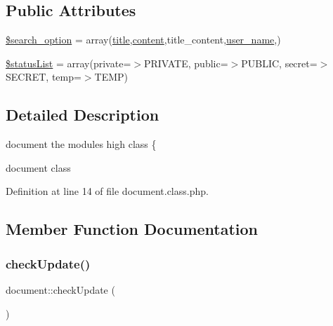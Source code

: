 \subsection*{Public Attributes}
\begin{DoxyCompactItemize}
\item 
\hyperlink{classdocument_adfef00d8f028ef4dfe991de199009d46}{\$search\+\_\+option} = array(\textquotesingle{}\hyperlink{ko_8install_8php_a5b072c5fd1d2228c6ba5cee13cd142e3}{title}\textquotesingle{},\textquotesingle{}\hyperlink{classcontent}{content}\textquotesingle{},\textquotesingle{}title\+\_\+content\textquotesingle{},\textquotesingle{}\hyperlink{ko_8install_8php_a115401aff7da80e73c66e9f76505426b}{user\+\_\+name}\textquotesingle{},)
\item 
\hyperlink{classdocument_a93e1c85a4ec17a1471b874fdb14cce58}{\$status\+List} = array(\textquotesingle{}private\textquotesingle{}=$>$\textquotesingle{}P\+R\+I\+V\+A\+TE\textquotesingle{}, \textquotesingle{}public\textquotesingle{}=$>$\textquotesingle{}P\+U\+B\+L\+IC\textquotesingle{}, \textquotesingle{}secret\textquotesingle{}=$>$\textquotesingle{}S\+E\+C\+R\+ET\textquotesingle{}, \textquotesingle{}temp\textquotesingle{}=$>$\textquotesingle{}T\+E\+MP\textquotesingle{})
\end{DoxyCompactItemize}


\subsection{Detailed Description}
document the module\textquotesingle{}s high class \{ 

document class 

Definition at line 14 of file document.\+class.\+php.



\subsection{Member Function Documentation}
\mbox{\label{classdocument_a71d01592758989490b56cbd6a2a92e37}} 
\subsubsection{\texorpdfstring{check\+Update()}{checkUpdate()}}
{\footnotesize\ttfamily document\+::check\+Update (\begin{DoxyParamCaption}{ }\end{DoxyParamCaption})}

